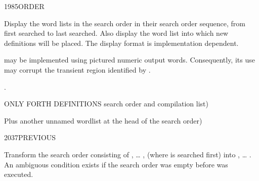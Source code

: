 \begin{worddef}{1985}{ORDER}
\item \stack{}{}

	Display the word lists in the search order in their search order
	sequence, from first searched to last searched. Also display the
	word list into which new definitions will be placed. The display
	format is implementation dependent.

	 may be implemented using pictured numeric output
	words. Consequently, its use may corrupt the transient region
	identified by .

\see {}.

	\begin{testing}\ttfamily
		  ONLY FORTH DEFINITIONS search order and compilation list)  \\

		  Plus another unnamed wordlist at the head of the search order)  \\
	\end{testing}
\end{worddef}


\begin{worddef}{2037}{PREVIOUS}
\item \stack{}{}

	Transform the search order consisting of , {\ldots}
	,  (where  is searched
	first) into , {\ldots} . An ambiguous
	condition exists if the search order was empty before
	 was executed.
\end{worddef}
